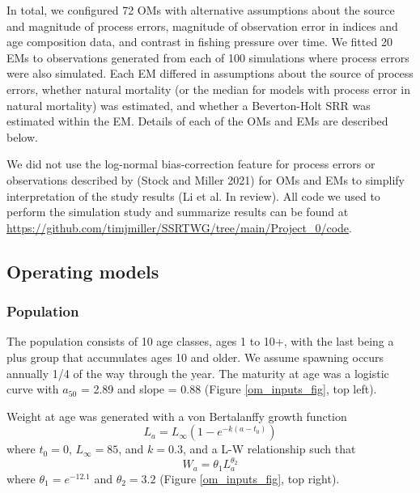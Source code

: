 \documentclass[
  12pt,
]{article}
\begin{document}
In total, we configured 72 OMs with alternative assumptions about the
source and magnitude of process errors, magnitude of observation error
in indices and age composition data, and contrast in fishing pressure
over time. We fitted 20 EMs to observations generated from each of 100
simulations where process errors were also simulated. Each EM differed
in assumptions about the source of process errors, whether natural
mortality (or the median for models with process error in natural
mortality) was estimated, and whether a Beverton-Holt SRR was estimated
within the EM. Details of each of the OMs and EMs are described below.

We did not use the log-normal bias-correction feature for process errors
or observations described by (Stock and Miller 2021) for OMs and EMs to
simplify interpretation of the study results (Li et al. In review). All
code we used to perform the simulation study and summarize results can
be found at
\url{https://github.com/timjmiller/SSRTWG/tree/main/Project_0/code}.

\hypertarget{operating-models}{%
\subsection*{Operating models}\label{operating-models}}

\hypertarget{population}{%
\subsubsection*{Population}\label{population}}

The population consists of 10 age classes, ages 1 to 10+, with the last
being a plus group that accumulates ages 10 and older. We assume
spawning occurs annually 1/4 of the way through the year. The maturity
at age was a logistic curve with \(a_{50}\) = 2.89 and slope = 0.88
(Figure \ref{om_inputs_fig}, top left).

Weight at age was generated with a von Bertalanffy growth function \[
L_a = L_{\infty}\left(1 - e^{-k(a - t_0)}\right)
\] where \(t_0 = 0\), \(L_\infty = 85\), and \(k = 0.3\), and a L-W
relationship such that \[
W_a = \theta_1 L_a^{\theta_2}
\] where \(\theta_1 = e^{-12.1}\) and \(\theta_2 = 3.2\) (Figure
\ref{om_inputs_fig}, top right).
\end{document}
